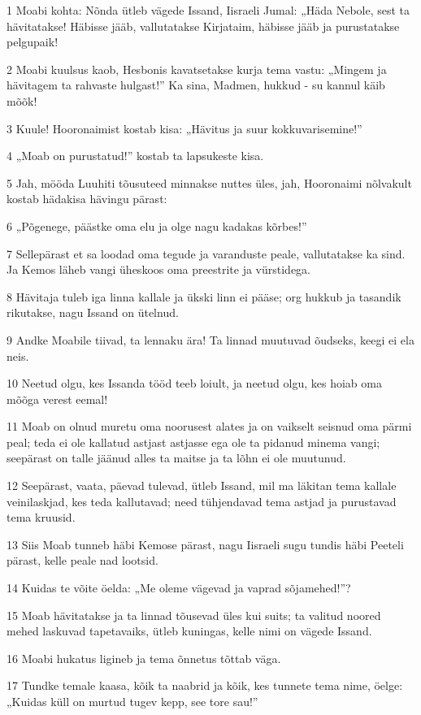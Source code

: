 \par 1 Moabi kohta: Nõnda ütleb vägede Issand, Iisraeli Jumal: „Häda Nebole, sest ta hävitatakse! Häbisse jääb, vallutatakse Kirjataim, häbisse jääb ja purustatakse pelgupaik!
\par 2 Moabi kuulsus kaob, Hesbonis kavatsetakse kurja tema vastu: „Mingem ja hävitagem ta rahvaste hulgast!” Ka sina, Madmen, hukkud - su kannul käib mõõk!
\par 3 Kuule! Hooronaimist kostab kisa: „Hävitus ja suur kokkuvarisemine!”
\par 4 „Moab on purustatud!” kostab ta lapsukeste kisa.
\par 5 Jah, mööda Luuhiti tõusuteed minnakse nuttes üles, jah, Hooronaimi nõlvakult kostab hädakisa hävingu pärast:
\par 6 „Põgenege, päästke oma elu ja olge nagu kadakas kõrbes!”
\par 7 Sellepärast et sa loodad oma tegude ja varanduste peale, vallutatakse ka sind. Ja Kemos läheb vangi üheskoos oma preestrite ja vürstidega.
\par 8 Hävitaja tuleb iga linna kallale ja ükski linn ei pääse; org hukkub ja tasandik rikutakse, nagu Issand on ütelnud.
\par 9 Andke Moabile tiivad, ta lennaku ära! Ta linnad muutuvad õudseks, keegi ei ela neis.
\par 10 Neetud olgu, kes Issanda tööd teeb loiult, ja neetud olgu, kes hoiab oma mõõga verest eemal!
\par 11 Moab on olnud muretu oma noorusest alates ja on vaikselt seisnud oma pärmi peal; teda ei ole kallatud astjast astjasse ega ole ta pidanud minema vangi; seepärast on talle jäänud alles ta maitse ja ta lõhn ei ole muutunud.
\par 12 Seepärast, vaata, päevad tulevad, ütleb Issand, mil ma läkitan tema kallale veinilaskjad, kes teda kallutavad; need tühjendavad tema astjad ja purustavad tema kruusid.
\par 13 Siis Moab tunneb häbi Kemose pärast, nagu Iisraeli sugu tundis häbi Peeteli pärast, kelle peale nad lootsid.
\par 14 Kuidas te võite öelda: „Me oleme vägevad ja vaprad sõjamehed!”?
\par 15 Moab hävitatakse ja ta linnad tõusevad üles kui suits; ta valitud noored mehed laskuvad tapetavaiks, ütleb kuningas, kelle nimi on vägede Issand.
\par 16 Moabi hukatus ligineb ja tema õnnetus tõttab väga.
\par 17 Tundke temale kaasa, kõik ta naabrid ja kõik, kes tunnete tema nime, öelge: „Kuidas küll on murtud tugev kepp, see tore sau!”

